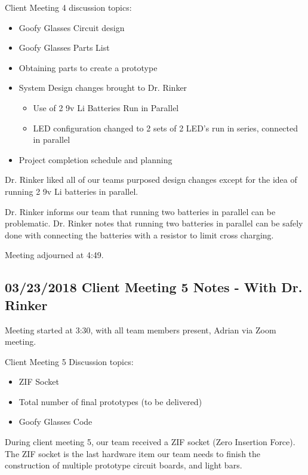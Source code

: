 \documentclass[12pt]{article}
\begin{document}
	\noindent
	Client Meeting 4 discussion topics:
	
	\begin{itemize}
	\item Goofy Glasses Circuit design
	\item Goofy Glasses Parts List
	\item Obtaining parts to create a prototype
	\item System Design changes brought to Dr. Rinker
	
		\begin{itemize}
		\item Use of 2 9v Li Batteries Run in Parallel
		\item LED configuration changed to 2 sets of 2 LED's run in series, connected 		in parallel
		\end{itemize}
	\item Project completion schedule and planning
	\end{itemize}
	
	\noindent
	Dr. Rinker liked all of our teams purposed design changes except for the idea of 		running 2 9v Li batteries in parallel.
	
	\noindent
	Dr. Rinker informs our team that running two batteries in parallel can be 				problematic. Dr. Rinker notes that running two batteries in parallel can be 			safely done with connecting the batteries with a resistor to limit cross 				charging.
	
	Meeting adjourned at 4:49.
	
	\clearpage
	\subsection{03/23/2018 Client Meeting 5 Notes - With Dr. Rinker}
	Meeting started at 3:30, with all team members present, Adrian via Zoom meeting.
	
	\noindent
	Client Meeting 5 Discussion topics:\\
		\begin{itemize}
			\item ZIF Socket
			\item Total number of final prototypes (to be delivered)
			\item Goofy Glasses Code\\
		\end{itemize}
		
		\noindent
		During client meeting 5, our team received a ZIF socket (Zero Insertion 				Force). The ZIF socket is the last hardware item our team needs to finish the 		construction of multiple prototype circuit boards, and light bars. \\
		
\end{document}
